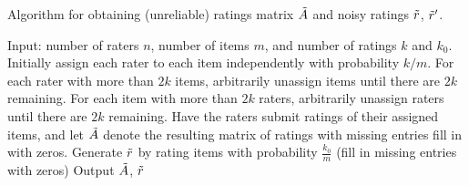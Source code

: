 \begin{algorithm}[t!]
\caption{Algorithm for obtaining (unreliable) ratings matrix $\tilde{A}$ and noisy 
ratings $\tilde{r}$, $\tilde{r}'$.}
\label{alg:create-A}
\begin{algorithmic}[1]
\State Input: number of raters $n$,  number of items $m$, and number of ratings $k$ and $k_0$.
\State Initially assign each rater to each item independently with probability $k/m$.  
\State For each rater with more than $2k$ items, arbitrarily unassign items until 
       there are $2k$ remaining.
\State For each item with more than $2k$
       raters, arbitrarily unassign raters until there are $2k$ remaining.
\State Have the raters submit ratings of their assigned items, and let $\tilde{A}$ 
       denote the resulting matrix of ratings with missing entries fill in with 
       zeros.
\State Generate $\tilde{r}$ by rating items with probability $\frac{k_0}{m}$ (fill in missing entries with zeros)
\State Output $\tilde{A}$, $\tilde{r}$%
\end{algorithmic}
\end{algorithm}


